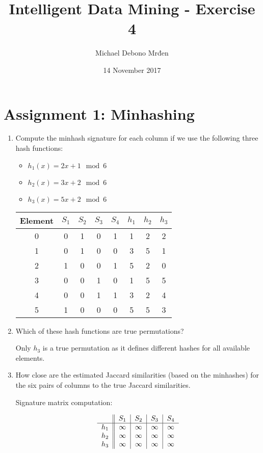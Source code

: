 \documentclass{article}
\title{Intelligent Data Mining - Exercise 4}
\author{\fontencoding{T1}\selectfont Michael Debono Mrđen}
\date{14 November 2017}
\begin{document}
\maketitle

\section{Assignment 1: Minhashing}
\renewcommand{\labelenumi}{\alph{enumi}.}
\renewcommand{\labelenumii}{(\alph{enumii})}

\begin{enumerate}
\item{Compute the minhash signature for each column if we use the following three hash functions:
	\begin{itemize}
		\item $h_1(x)=2x+1\mod{6}$
		\item $h_2(x)=3x+2\mod{6}$
		\item $h_3(x)=5x+2\mod{6}$
	\end{itemize}

\begin{center}
\begin{tabular}{ c | c | c | c | c || c | c | c }
	Element & $S_1$ & $S_2$ & $S_3$ & $S_4$ & $h_1$ & $h_2$ & $h_3$ \\ \hline\hline
	0       & 0     & 1     & 0     & 1     & 1     & 2     & 2     \\
	1       & 0     & 1     & 0     & 0     & 3     & 5     & 1     \\
	2       & 1     & 0     & 0     & 1     & 5     & 2     & 0     \\
	3       & 0     & 0     & 1     & 0     & 1     & 5     & 5     \\
	4       & 0     & 0     & 1     & 1     & 3     & 2     & 4     \\
	5       & 1     & 0     & 0     & 0     & 5     & 5     & 3
\end{tabular}
\end{center}
	
}
\item{Which of these hash functions are true permutations?
	
Only $h_3$ is a true permutation as it defines different hashes for all available elements.
}
\item{How close are the estimated Jaccard similarities (based on the minhashes) for the six pairs of columns to the true Jaccard similarities.

Signature matrix computation:
\begin{center}
	\begin{equation}
	\begin{tabular}{ c || c | c | c | c } \label{1}
		      & $S_1$    & $S_2$    & $S_3$    & $S_4$    \\ \hline
		$h_1$ & $\infty$ & $\infty$ & $\infty$ & $\infty$ \\
		$h_2$ & $\infty$ & $\infty$ & $\infty$ & $\infty$ \\
		$h_3$ & $\infty$ & $\infty$ & $\infty$ & $\infty$
	\end{tabular}
	\end{equation}


\end{center}}
\end{enumerate}
\end{document}
